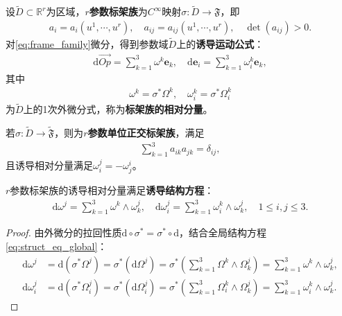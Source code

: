 \documentclass[../../main.tex]{subfiles}%
\begin{document}
\begin{definition}
设$\tilde{D}\subset\mathbb{R}^r$为区域，\textbf{$r$参数标架族}为$C^\infty$映射$\sigma:\tilde{D}\to\mathfrak{F}$，即
\begin{align}
a_i=a_i(u^1,\cdots,u^r),\quad a_{ij}=a_{ij}(u^1,\cdots,u^r),\quad \det(a_{ij})>0.
\label{eq:frame_family}
\end{align}
对\eqref{eq:frame_family}微分，得到参数域$\tilde{D}$上的\textbf{诱导运动公式}：
\begin{align}
\mathrm{d}\overrightarrow{Op}=\sum\limits_{k=1}^3\omega^k\boldsymbol{e}_k,\quad \mathrm{d}\boldsymbol{e}_i=\sum\limits_{k=1}^3\omega_i^k\boldsymbol{e}_k,
\label{eq:induced_motion}
\end{align}
其中
\begin{align}
\omega^k=\sigma^*\Omega^k,\quad \omega_i^k=\sigma^*\Omega_i^k
\label{eq:induced_rel_comp}
\end{align}
为$\tilde{D}$上的1次外微分式，称为\textbf{标架族的相对分量}。

若$\sigma:\tilde{D}\to\tilde{\mathfrak{F}}$，则为\textbf{$r$参数单位正交标架族}，满足
\begin{align}
\sum\limits_{k=1}^3a_{ik}a_{jk}=\delta_{ij},
\label{eq:ortho_family_cond}
\end{align}
且诱导相对分量满足$\omega_i^j=-\omega_j^i$。
\end{definition}

\begin{theorem}
$r$参数标架族的诱导相对分量满足\textbf{诱导结构方程}：
\begin{align}
\mathrm{d}\omega^j=\sum\limits_{k=1}^3\omega^k\wedge\omega_k^j,\quad \mathrm{d}\omega_i^j=\sum\limits_{k=1}^3\omega_i^k\wedge\omega_k^j,\quad 1\leqslant i,j\leqslant3.
\label{eq:struct_eq_induced}
\end{align}
\end{theorem}
\begin{proof}
由外微分的拉回性质$\mathrm{d}\circ\sigma^*=\sigma^*\circ\mathrm{d}$，结合全局结构方程\eqref{eq:struct_eq_global}：
\begin{align*}
\mathrm{d}\omega^j&=\mathrm{d}(\sigma^*\Omega^j)=\sigma^*(\mathrm{d}\Omega^j)=\sigma^*\left(\sum\limits_{k=1}^3\Omega^k\wedge\Omega_k^j\right)=\sum\limits_{k=1}^3\omega^k\wedge\omega_k^j,\\
\mathrm{d}\omega_i^j&=\mathrm{d}(\sigma^*\Omega_i^j)=\sigma^*(\mathrm{d}\Omega_i^j)=\sigma^*\left(\sum\limits_{k=1}^3\Omega_i^k\wedge\Omega_k^j\right)=\sum\limits_{k=1}^3\omega_i^k\wedge\omega_k^j.
\end{align*}
\end{proof}
\end{document}
